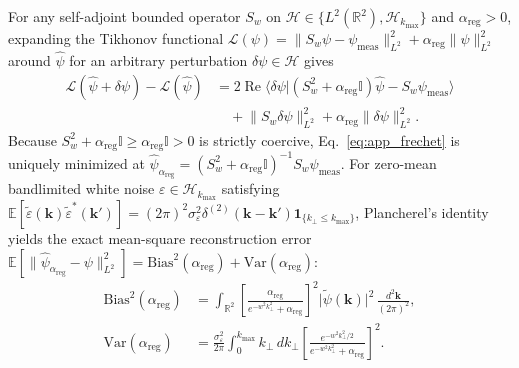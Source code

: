\documentclass[aps,pra,onecolumn,notitlepage,11pt,tightenlines,nofootinbib,floatfix,longbibliography]{revtex4-2}
\theoremstyle{remark}
\newcommand{\braket}[2]{\langle #1 | #2 \rangle}
\newcommand{\norm}[1]{\lVert #1 \rVert}
\newcommand{\abs}[1]{\lvert #1 \rvert}
\begin{document}
For any self-adjoint bounded operator $S_w$ on $\mathcal{H} \in \{L^2(\mathbb{R}^2), \mathcal{H}_{k_{\max}}\}$ and $\alpha_{\mathrm{reg}} > 0$, expanding the Tikhonov functional $\mathcal{L}(\psi) = \norm{S_w\psi - \psi_{\mathrm{meas}}}_{L^2}^2 + \alpha_{\mathrm{reg}}\norm{\psi}_{L^2}^2$ around $\hat{\psi}$ for an arbitrary perturbation $\delta\psi \in \mathcal{H}$ gives
\begin{align}
\mathcal{L}(\hat{\psi}+\delta\psi) - \mathcal{L}(\hat{\psi}) &= 2\operatorname{Re}\braket{\delta\psi}{(S_w^2 + \alpha_{\mathrm{reg}}\mathbb{I})\hat{\psi} - S_w\psi_{\mathrm{meas}}} \nonumber \\
&\quad + \norm{S_w\delta\psi}_{L^2}^2 + \alpha_{\mathrm{reg}}\norm{\delta\psi}_{L^2}^2.
\label{eq:app_frechet}
\end{align}
Because $S_w^2 + \alpha_{\mathrm{reg}}\mathbb{I} \ge \alpha_{\mathrm{reg}}\mathbb{I} > 0$ is strictly coercive, Eq.~\eqref{eq:app_frechet} is uniquely minimized at $\hat{\psi}_{\alpha_{\mathrm{reg}}} = (S_w^2 + \alpha_{\mathrm{reg}}\mathbb{I})^{-1}S_w\psi_{\mathrm{meas}}$. For zero-mean bandlimited white noise $\varepsilon \in \mathcal{H}_{k_{\max}}$ satisfying $\mathbb{E}[\widetilde{\varepsilon}(\mathbf{k})\widetilde{\varepsilon}^*(\mathbf{k}')] = (2\pi)^2\sigma_\varepsilon^2\delta^{(2)}(\mathbf{k}-\mathbf{k}')\mathbf{1}_{\{k_\perp \le k_{\max}\}}$, Plancherel's identity yields the exact mean-square reconstruction error $\mathbb{E}[\norm{\hat{\psi}_{\alpha_{\mathrm{reg}}} - \psi}_{L^2}^2] = \mathrm{Bias}^2(\alpha_{\mathrm{reg}}) + \mathrm{Var}(\alpha_{\mathrm{reg}})$:
\begin{align}
\mathrm{Bias}^2(\alpha_{\mathrm{reg}}) &= \int_{\mathbb{R}^2} \left[\frac{\alpha_{\mathrm{reg}}}{e^{-w^2 k_\perp^2} + \alpha_{\mathrm{reg}}}\right]^2 \abs{\widetilde{\psi}(\mathbf{k})}^2\,\frac{d^2\mathbf{k}}{(2\pi)^2}, \nonumber \\
\mathrm{Var}(\alpha_{\mathrm{reg}}) &= \frac{\sigma_\varepsilon^2}{2\pi}\int_0^{k_{\max}} k_\perp\,dk_\perp \left[\frac{e^{-w^2 k_\perp^2/2}}{e^{-w^2 k_\perp^2} + \alpha_{\mathrm{reg}}}\right]^2.
\label{eq:app_bias_var_general}
\end{align}
\end{document}
